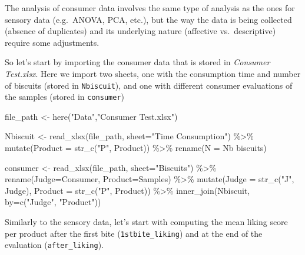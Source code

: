 \documentclass[
]{book}
\newenvironment{Shaded}{\begin{snugshade}}{\end{snugshade}}
\newcommand{\AttributeTok}[1]{\textcolor[rgb]{0.77,0.63,0.00}{#1}}
\newcommand{\FunctionTok}[1]{\textcolor[rgb]{0.00,0.00,0.00}{#1}}
\newcommand{\NormalTok}[1]{#1}
\newcommand{\OtherTok}[1]{\textcolor[rgb]{0.56,0.35,0.01}{#1}}
\newcommand{\SpecialCharTok}[1]{\textcolor[rgb]{0.00,0.00,0.00}{#1}}
\newcommand{\StringTok}[1]{\textcolor[rgb]{0.31,0.60,0.02}{#1}}
\begin{document}
The analysis of consumer data involves the same type of analysis as the ones for sensory data (e.g.~ANOVA, PCA, etc.), but the way the data is being collected (absence of duplicates) and its underlying nature (affective vs.~descriptive) require some adjustments.

So let's start by importing the consumer data that is stored in \emph{Consumer Test.xlsx}. Here we import two sheets, one with the consumption time and number of biscuits (stored in \texttt{Nbiscuit}), and one with different consumer evaluations of the samples (stored in \texttt{consumer})

\begin{Shaded}
\begin{Highlighting}[]
\NormalTok{file\_path }\OtherTok{\textless{}{-}} \FunctionTok{here}\NormalTok{(}\StringTok{"Data"}\NormalTok{,}\StringTok{"Consumer Test.xlsx"}\NormalTok{)}

\NormalTok{Nbiscuit }\OtherTok{\textless{}{-}} \FunctionTok{read\_xlsx}\NormalTok{(file\_path, }\AttributeTok{sheet=}\StringTok{"Time Consumption"}\NormalTok{) }\SpecialCharTok{\%\textgreater{}\%} 
  \FunctionTok{mutate}\NormalTok{(}\AttributeTok{Product =} \FunctionTok{str\_c}\NormalTok{(}\StringTok{"P"}\NormalTok{, Product)) }\SpecialCharTok{\%\textgreater{}\%} 
  \FunctionTok{rename}\NormalTok{(}\AttributeTok{N =} \StringTok{\textasciigrave{}}\AttributeTok{Nb biscuits}\StringTok{\textasciigrave{}}\NormalTok{)}

\NormalTok{consumer }\OtherTok{\textless{}{-}} \FunctionTok{read\_xlsx}\NormalTok{(file\_path, }\AttributeTok{sheet=}\StringTok{"Biscuits"}\NormalTok{) }\SpecialCharTok{\%\textgreater{}\%} 
  \FunctionTok{rename}\NormalTok{(}\AttributeTok{Judge=}\NormalTok{Consumer, }\AttributeTok{Product=}\NormalTok{Samples) }\SpecialCharTok{\%\textgreater{}\%} 
  \FunctionTok{mutate}\NormalTok{(}\AttributeTok{Judge =} \FunctionTok{str\_c}\NormalTok{(}\StringTok{"J"}\NormalTok{, Judge), }\AttributeTok{Product =} \FunctionTok{str\_c}\NormalTok{(}\StringTok{"P"}\NormalTok{, Product)) }\SpecialCharTok{\%\textgreater{}\%} 
  \FunctionTok{inner\_join}\NormalTok{(Nbiscuit, }\AttributeTok{by=}\FunctionTok{c}\NormalTok{(}\StringTok{"Judge"}\NormalTok{, }\StringTok{"Product"}\NormalTok{))}
\end{Highlighting}
\end{Shaded}

Similarly to the sensory data, let's start with computing the mean liking score per product after the first bite (\texttt{1stbite\_liking}) and at the end of the evaluation (\texttt{after\_liking}).
\end{document}
